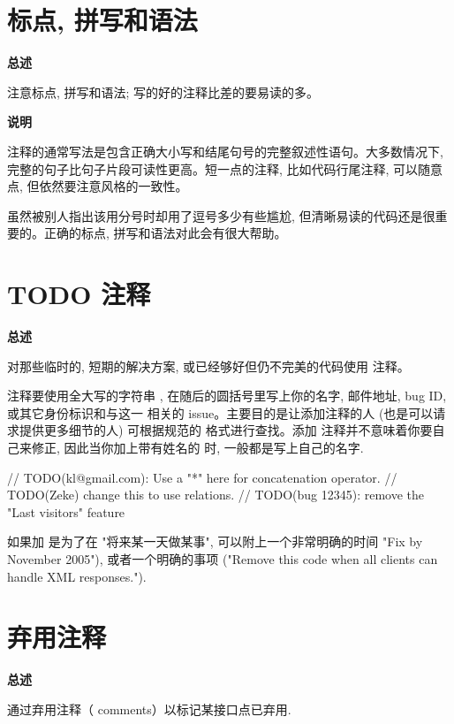 \section{标点, 拼写和语法}

\textbf{总述}

注意标点, 拼写和语法; 写的好的注释比差的要易读的多。

\textbf{说明}

注释的通常写法是包含正确大小写和结尾句号的完整叙述性语句。大多数情况下, 完整的句子比句子片段可读性更高。短一点的注释, 比如代码行尾注释, 可以随意点, 但依然要注意风格的一致性。

虽然被别人指出该用分号时却用了逗号多少有些尴尬, 但清晰易读的代码还是很重要的。正确的标点, 拼写和语法对此会有很大帮助。

\section{TODO 注释}

\textbf{总述}

对那些临时的, 短期的解决方案, 或已经够好但仍不完美的代码使用  注释。

 注释要使用全大写的字符串 , 在随后的圆括号里写上你的名字, 邮件地址, bug ID, 或其它身份标识和与这一  相关的 issue。主要目的是让添加注释的人 (也是可以请求提供更多细节的人) 可根据规范的  格式进行查找。添加  注释并不意味着你要自己来修正, 因此当你加上带有姓名的  时, 一般都是写上自己的名字.

\begin{cppcode}
  // TODO(kl@gmail.com): Use a "*" here for concatenation operator.
  // TODO(Zeke) change this to use relations.
  // TODO(bug 12345): remove the "Last visitors" feature
\end{cppcode}

如果加  是为了在 "将来某一天做某事", 可以附上一个非常明确的时间 "Fix by November 2005"), 或者一个明确的事项 ("Remove this code when all clients can handle XML responses.").

\section{弃用注释}

\textbf{总述}

通过弃用注释（ comments）以标记某接口点已弃用.


